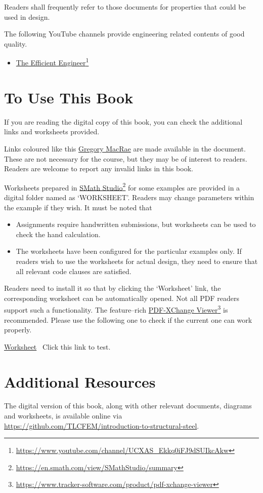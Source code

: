 Readers shall frequently refer to those documents for properties that could be used in design.

The following YouTube channels provide engineering related contents of good quality.
\begin{itemize}
\item \href{https://www.youtube.com/channel/UCXAS_Ekkq0iFJ9dSUIkcAkw}{The Efficient Engineer}\footnote{\url{https://www.youtube.com/channel/UCXAS_Ekkq0iFJ9dSUIkcAkw}}
\end{itemize}
\section{To Use This Book}
If you are reading the digital copy of this book, you can check the additional links and worksheets provided.

Links coloured like this \href{https://profiles.canterbury.ac.nz/Gregory-MacRae}{Gregory MacRae} are made available in the document. These are not necessary for the course, but they may be of interest to readers. Readers are welcome to report any invalid links in this book.

Worksheets prepared in \href{https://en.smath.com/view/SMathStudio/summary}{SMath Studio}\footnote{\url{https://en.smath.com/view/SMathStudio/summary}} for some examples are provided in a digital folder named as `WORKSHEET'. Readers may change parameters within the example if they wish. It must be noted that
\begin{itemize}
\item Assignments require handwritten submissions, but worksheets can be used to check the hand calculation.
\item The worksheets have been configured for the particular examples only. If readers wish to use the worksheets for actual design, they need to ensure that all relevant code clauses are satisfied.
\end{itemize}

Readers need to install it so that by clicking the `Worksheet' link, the corresponding worksheet can be automatically opened. Not all PDF readers support such a functionality. The feature--rich \href{https://www.tracker-software.com/product/pdf-xchange-viewer}{PDF-XChange Viewer}\footnote{\url{https://www.tracker-software.com/product/pdf-xchange-viewer}} is recommended. Please use the following one to check if the current one can work properly.
\begin{exmp}
\href{run:./WORKSHEET/CH00/EX0.TEST.sm}{Worksheet}
\textleftarrow~Click this link to test.
\end{exmp}
\section{Additional Resources}
The digital version of this book, along with other relevant documents, diagrams and worksheets, is available online via \href{https://github.com/TLCFEM/introduction-to-structural-steel}{\url{https://github.com/TLCFEM/introduction-to-structural-steel}}.
